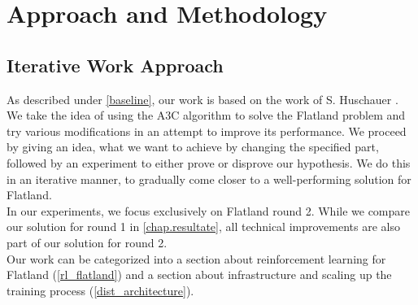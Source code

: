 
%
%

\chapter{Approach and Methodology}\label{chap.vorgehen}
\section{Iterative Work Approach}\label{basic_cons}
As described under \autoref{baseline}, our work is based on the work of S. Huschauer \cite{flatlandstephan}. We take the idea of using the A3C algorithm to solve the Flatland problem and try various modifications in an attempt to improve its performance. We proceed by giving an idea, what we want to achieve by changing the specified part, followed by an experiment to either prove or disprove our hypothesis. We do this in an iterative manner, to gradually come closer to a well-performing solution for Flatland.\\
In our experiments, we focus exclusively on Flatland round 2. While we compare our solution for round 1 in \autoref{chap.resultate}, all technical improvements are also part of our solution for round 2.\\
Our work can be categorized into a section about reinforcement learning for Flatland (\autoref{rl_flatland}) and a section about infrastructure and scaling up the training process (\autoref{dist_architecture}).\\
